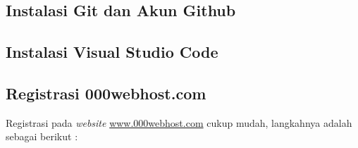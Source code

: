 \subsection{Instalasi Git dan Akun Github}



\subsection{Instalasi Visual Studio Code}

\subsection{Registrasi 000webhost.com}

Registrasi pada \textit{website} \url{www.000webhost.com} cukup mudah, langkahnya adalah sebagai berikut :

